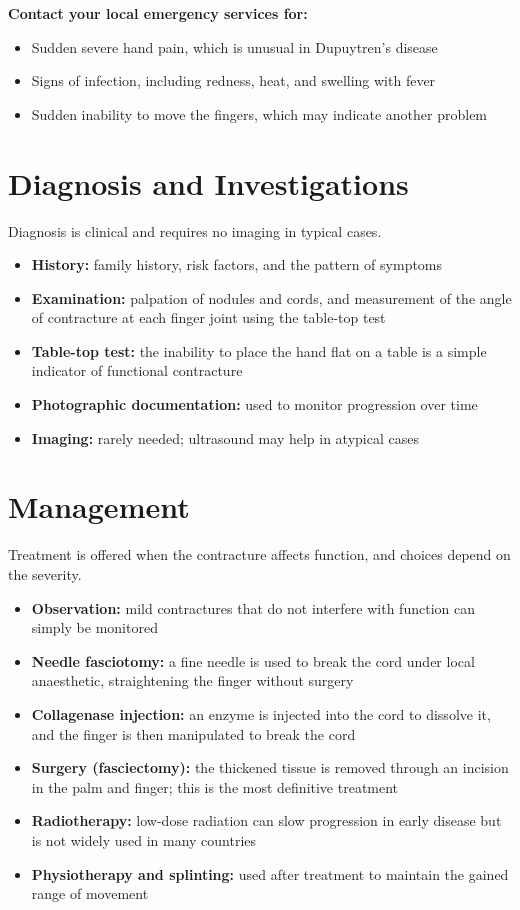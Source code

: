 \textbf{Contact your local emergency services for:}
\begin{itemize}
    \item Sudden severe hand pain, which is unusual in Dupuytren's disease
    \item Signs of infection, including redness, heat, and swelling with fever
    \item Sudden inability to move the fingers, which may indicate another problem
\end{itemize}

\section*{Diagnosis and Investigations}
Diagnosis is clinical and requires no imaging in typical cases.
\begin{itemize}
    \item \textbf{History:} family history, risk factors, and the pattern of symptoms
    \item \textbf{Examination:} palpation of nodules and cords, and measurement of the angle of contracture at each finger joint using the table-top test
    \item \textbf{Table-top test:} the inability to place the hand flat on a table is a simple indicator of functional contracture
    \item \textbf{Photographic documentation:} used to monitor progression over time
    \item \textbf{Imaging:} rarely needed; ultrasound may help in atypical cases
\end{itemize}

\section*{Management}
Treatment is offered when the contracture affects function, and choices depend on the severity.
\begin{itemize}
    \item \textbf{Observation:} mild contractures that do not interfere with function can simply be monitored
    \item \textbf{Needle fasciotomy:} a fine needle is used to break the cord under local anaesthetic, straightening the finger without surgery
    \item \textbf{Collagenase injection:} an enzyme is injected into the cord to dissolve it, and the finger is then manipulated to break the cord
    \item \textbf{Surgery (fasciectomy):} the thickened tissue is removed through an incision in the palm and finger; this is the most definitive treatment
    \item \textbf{Radiotherapy:} low-dose radiation can slow progression in early disease but is not widely used in many countries
    \item \textbf{Physiotherapy and splinting:} used after treatment to maintain the gained range of movement
\end{itemize}

